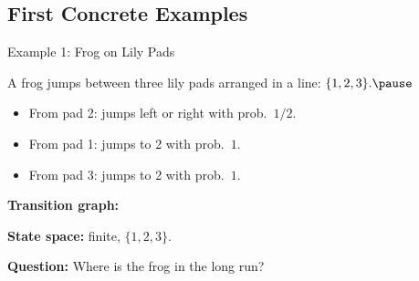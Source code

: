 \documentclass[aspectratio=169]{beamer}
\begin{document}
\subsection{First Concrete Examples}

\begin{frame}{Example 1: Frog on Lily Pads}

A frog jumps between three lily pads arranged in a line:
$
\{1,2,3\}.\pause
$

\begin{itemize}
  \item From pad 2: jumps left or right with prob.\ $1/2$.\pause
  \item From pad 1: jumps to 2 with prob.\ $1$.\pause
  \item From pad 3: jumps to 2 with prob.\ $1$.\pause
\end{itemize}

\medskip
\textbf{Transition graph:}

\begin{center}
\end{center}

\medskip
\textbf{State space:} finite, $\{1,2,3\}$.\pause

\medskip
\textbf{Question:}
Where is the frog in the long run?

\end{frame}
\end{document}
